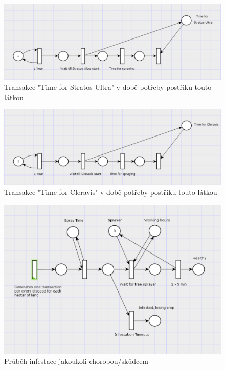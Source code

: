 \documentclass[11pt,a4paper,titlepage]{article}
\begin{document}
\begin{figure}[ht!]
\centering
\includegraphics[scale=0.3]{img/GenStratosUltraTime.png}
\caption{Transakce "Time for Stratos Ultra" v době potřeby postřiku touto látkou}
\end{figure}

\begin{figure}[ht!]
\centering
\includegraphics[scale=0.3]{img/GenCleravisTime.png}
\caption{Transakce "Time for Cleravis" v době potřeby postřiku touto látkou}
\end{figure}

\begin{figure}[ht!]
\centering
\includegraphics[scale=0.3]{img/Infestation.png}
\caption{Průběh infestace jakoukoli chorobou/skůdcem}
\end{figure}
\end{document}
